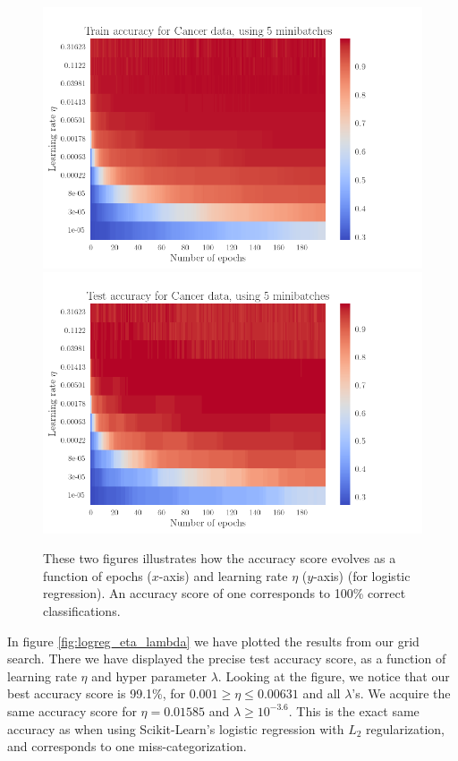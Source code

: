 \documentclass[12pt]{extarticle}
\begin{document}
\begin{figure}[h]
	\includegraphics[width=\linewidth]{../output/plots/reg_Cancer__epochs_eta__Train_accuracy__705107.png}
	\includegraphics[width=\linewidth]{../output/plots/reg_Cancer__epochs_eta__Test_accuracy__924831.png}
	\caption{These two figures illustrates how the accuracy score evolves as a function of epochs ($x$-axis) and learning rate $\eta$ ($y$-axis) (for logistic regression). An accuracy score of one corresponds to 100\% correct classifications.}\label{fig:logreg_eta_epoch}
\end{figure}

In figure \ref{fig:logreg_eta_lambda} we have plotted the results from our grid search. There we have displayed the precise test accuracy score, as a function of learning rate $\eta$ and hyper parameter $\lambda$. Looking at the figure, we notice that our best accuracy score is 99.1\%, for $0.001 \geq \eta \leq 0.00631$ and all $\lambda$'s. We acquire the same accuracy score for $\eta = 0.01585$ and $\lambda\geq 10^{-3.6}$. This is the exact same accuracy as when using Scikit-Learn's logistic regression with $L_2$ regularization, and corresponds to one miss-categorization.
\end{document}
